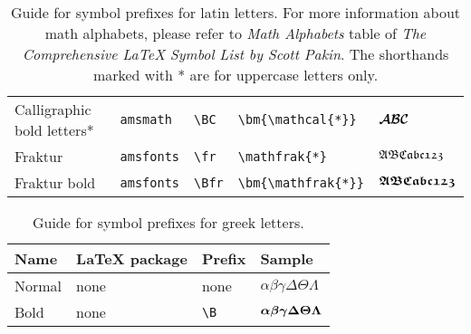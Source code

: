 \documentclass[]{article}
\begin{document}
\begin{table}[htbp]
\begin{tabular}{p{14em} l l l l}
    Calligraphic bold letters* & \texttt{amsmath} & \verb+\BC+ & \verb+\bm{\mathcal{*}}+ & $\bm{\mathcal{A}}\bm{\mathcal{B}}\bm{\mathcal{C}}$ \\
    Fraktur & \texttt{amsfonts} & \verb+\fr+ & \verb+\mathfrak{*}+ & $\mathfrak{A}\mathfrak{B}\mathfrak{C}\mathfrak{a}\mathfrak{b}\mathfrak{c}\mathfrak{1}\mathfrak{2}\mathfrak{3}$\\
    Fraktur bold & \texttt{amsfonts} & \verb+\Bfr+ & \verb+\bm{\mathfrak{*}}+ & $\bm{\mathfrak{A}}\bm{\mathfrak{B}}\bm{\mathfrak{C}}\bm{\mathfrak{a}}\bm{\mathfrak{b}}\bm{\mathfrak{c}}\bm{\mathfrak{1}}\bm{\mathfrak{2}}\bm{\mathfrak{3}}$\\
    \bottomrule
  \end{tabular}
  \caption{Guide for symbol prefixes for latin letters. For more information about math alphabets,
    please refer to {\em Math Alphabets} table of
    \emph{The Comprehensive \LaTeX{} Symbol List by Scott Pakin}.
    The shorthands marked with * are for uppercase letters only.}
  \label{tb:math}
\end{table}

\begin{table}[htbp]
  \centering
\begin{tabular}{p{14em} l l l}
  \toprule
  Name & \LaTeX{} package & Prefix & Sample \\
  \midrule
  Normal & none & none & $\alpha\beta\gamma\Delta\Theta\Lambda$ \\
  Bold & none & \verb+\B+ & $\bm{\alpha}\bm{\beta}\bm{\gamma}\bm{\Delta}\bm{\Theta}\bm{\Lambda}$ \\
  \bottomrule
\end{tabular}
\caption{Guide for symbol prefixes for greek letters.}
\label{tb:greek1}
\end{table}
\end{document}
